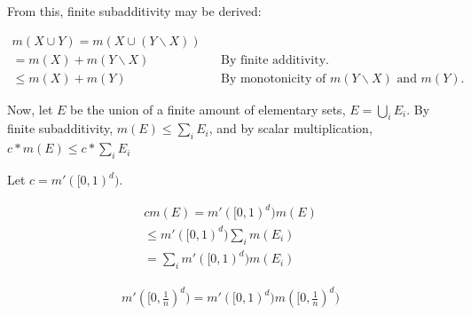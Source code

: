 \documentclass[12pt,letterpaper]{article}
\begin{document}
From this, finite subadditivity may be derived:

\begin{equation}
   \begin{aligned}
      m(X \cup Y) = m(X \cup (Y \backslash X)) \\ 
      = m(X) + m(Y \backslash X) && \text{By finite additivity.} \\
      \le m(X) + m(Y) && \text{By monotonicity of $m(Y \backslash X)$ and $m(Y)$.}
   \end{aligned}
\end{equation}

Now, let $E$ be the union of a finite amount of elementary sets, $E = \bigcup_i E_i$.
By finite subadditivity, $m(E) \le \sum_i E_i$, and by scalar multiplication, $c * m(E) \le c * \sum_i E_i$

Let $c = m'([0,1)^d)$.

\begin{equation}
   \begin{aligned}
      c m(E) = m'([0,1)^d) m(E) \\
      \le m'([0,1)^d) \sum_i m(E_i) \\
      = \sum_i m'([0,1)^d) m(E_i)
   \end{aligned}
\end{equation}

\begin{equation}
   \begin{aligned}
      m'([0, \frac{1}{n})^d) = m'([0,1)^d) m([0, \frac{1}{n})^d)
    \end{aligned}
\end{equation}
\end{document}
